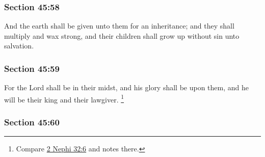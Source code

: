 
	\subsubsection{Section 45:58} %
		\label{DC45-58}

		And the earth shall be given unto them for an inheritance; and they shall multiply and wax strong, and their children shall grow up without sin unto salvation.


	\subsubsection{Section 45:59} %
		\label{DC45-59}

		For the Lord shall be in their midst, and his glory shall be upon them, and he will be their king and their lawgiver.%
			\footnote{%
				Compare \hyperref[2NEPHI-32-6]{2 Nephi 32:6} and notes there.
				}


	\subsubsection{Section 45:60} %
		\label{DC45-60}

